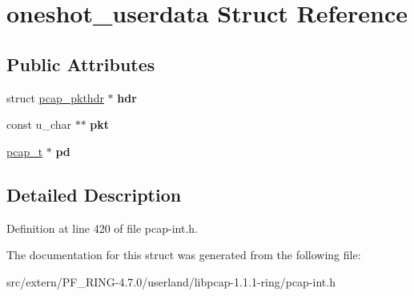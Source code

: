 \hypertarget{structoneshot__userdata}{
\section{oneshot\_\-userdata Struct Reference}
\label{structoneshot__userdata}
}
\subsection*{Public Attributes}
\begin{DoxyCompactItemize}
\item 
\hypertarget{structoneshot__userdata_ae405fb7a520b88b415af5125aa9c81e9}{
struct \hyperlink{structpcap__pkthdr}{pcap\_\-pkthdr} $\ast$ {\bfseries hdr}}
\label{structoneshot__userdata_ae405fb7a520b88b415af5125aa9c81e9}

\item 
\hypertarget{structoneshot__userdata_aa1c59b2c4d5c7071f6393889e3efa1af}{
const u\_\-char $\ast$$\ast$ {\bfseries pkt}}
\label{structoneshot__userdata_aa1c59b2c4d5c7071f6393889e3efa1af}

\item 
\hypertarget{structoneshot__userdata_a19bdd39dc5d7a96b91c7c9fb809ccefe}{
\hyperlink{structpcap}{pcap\_\-t} $\ast$ {\bfseries pd}}
\label{structoneshot__userdata_a19bdd39dc5d7a96b91c7c9fb809ccefe}

\end{DoxyCompactItemize}


\subsection{Detailed Description}


Definition at line 420 of file pcap-\/int.h.



The documentation for this struct was generated from the following file:\begin{DoxyCompactItemize}
\item 
src/extern/PF\_\-RING-\/4.7.0/userland/libpcap-\/1.1.1-\/ring/pcap-\/int.h\end{DoxyCompactItemize}
